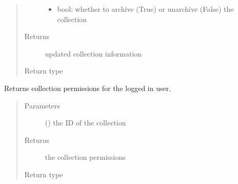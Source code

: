 \documentclass[letterpaper,10pt,english]{sphinxmanual}
\begin{document}
\begin{fulllineitems}
\begin{fulllineitems}
\begin{quote}
\begin{description}
\begin{itemize}
\item {} 
\sphinxAtStartPar
{} \textendash{} bool: whether to archive (True) or unarchive (False) the collection

\end{itemize}

\item[{Returns}] \leavevmode
\sphinxAtStartPar
updated collection information

\item[{Return type}] \leavevmode
\sphinxAtStartPar
{}

\end{description}\end{quote}

\end{fulllineitems}


\begin{fulllineitems}
\label{\detokenize{autoapi/pine/client/client/index:pine.client.client.PineClient.get_collection_permissions}}
\sphinxAtStartPar
Returns collection permissions for the logged in user.
\begin{quote}\begin{description}
\item[{Parameters}] \leavevmode
\sphinxAtStartPar
{} () \textendash{} the ID of the collection

\item[{Returns}] \leavevmode
\sphinxAtStartPar
the collection permissions

\item[{Return type}] \leavevmode
\sphinxAtStartPar
{\hyperref[\detokenize{autoapi/pine/backend/models/index:pine.backend.models.CollectionUserPermissions}]{}}


\end{description}
\end{quote}
\end{fulllineitems}
\end{fulllineitems}
\end{document}
